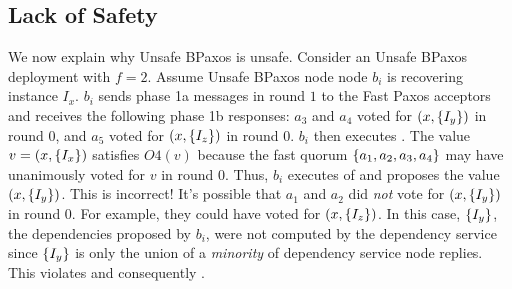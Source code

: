 \subsection{Lack of Safety}
We now explain why Unsafe BPaxos is unsafe. Consider an Unsafe BPaxos
deployment with $f = 2$. Assume Unsafe BPaxos node node $b_i$ is recovering
instance $I_x$. $b_i$ sends phase 1a messages in round $1$ to the Fast Paxos
acceptors and receives the following phase 1b responses:
  $a_3$ and $a_4$ voted for $(x, \{I_y\})$ in round $0$, and
  $a_5$ voted for $(x, \{I_z\})$ in round $0$.
$b_i$ then executes . The value $v = (x, \{I_x\})$
satisfies $O4(v)$ because the fast quorum $\{a_1, a_2, a_3, a_4\}$ may have
unanimously voted for $v$ in round $0$.  Thus, $b_i$ executes
 of  and proposes the value $(x,
\{I_y\})$.
%
This is incorrect! It's possible that $a_1$ and $a_2$ did \emph{not} vote for
$(x, \{I_y\})$ in round $0$. For example, they could have voted for $(x,
\{I_z\})$. In this case, $\{I_y\}$, the dependencies proposed by $b_i$,
were not computed by the dependency service since $\{I_y\}$ is only the union
of a \emph{minority} of dependency service node replies. This violates
 and consequently .


